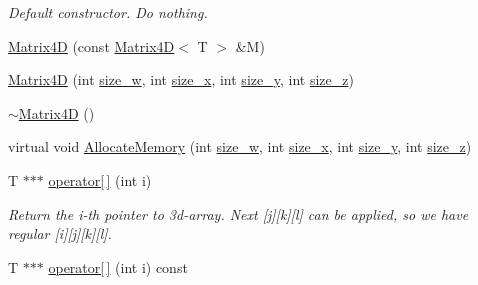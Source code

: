 \begin{DoxyCompactItemize}
\begin{DoxyCompactList}\small\item\em Default constructor. Do nothing. \end{DoxyCompactList}\item 
\hyperlink{class_matrix4_d_abc926df70f376a6002f8a87c5af64c21}{Matrix4\+D} (const \hyperlink{class_matrix4_d}{Matrix4\+D}$<$ T $>$ \&M)
\item 
\hyperlink{class_matrix4_d_a2ea183891bdf8361b090460dd67726fd}{Matrix4\+D} (int \hyperlink{class_matrix4_d_a31cea34356ad05c4ceb7d30335dce12c}{size\+\_\+w}, int \hyperlink{class_matrix4_d_a54dd815737a0dc10f0aa5e6275d07511}{size\+\_\+x}, int \hyperlink{class_matrix4_d_a0aedb1cd50bb694fbf74eb7068069da8}{size\+\_\+y}, int \hyperlink{class_matrix4_d_a8db60ddcda3b507665e2a4fb0dcf638a}{size\+\_\+z})
\item 
\hyperlink{class_matrix4_d_a2062fdb472d0426e49c62169c93e3b26}{$\sim$\+Matrix4\+D} ()
\item 
virtual void \hyperlink{class_matrix4_d_a6c541778e431631eaeb78bfa8e44af70}{Allocate\+Memory} (int \hyperlink{class_matrix4_d_a31cea34356ad05c4ceb7d30335dce12c}{size\+\_\+w}, int \hyperlink{class_matrix4_d_a54dd815737a0dc10f0aa5e6275d07511}{size\+\_\+x}, int \hyperlink{class_matrix4_d_a0aedb1cd50bb694fbf74eb7068069da8}{size\+\_\+y}, int \hyperlink{class_matrix4_d_a8db60ddcda3b507665e2a4fb0dcf638a}{size\+\_\+z})
\item 
T $\ast$$\ast$$\ast$ \hyperlink{class_matrix4_d_aa1937700dc627bd2ff8381c48345385e}{operator\mbox{[}$\,$\mbox{]}} (int i)
\begin{DoxyCompactList}\small\item\em Return the i-\/th pointer to 3d-\/array. Next \mbox{[}j\mbox{]}\mbox{[}k\mbox{]}\mbox{[}l\mbox{]} can be applied, so we have regular \mbox{[}i\mbox{]}\mbox{[}j\mbox{]}\mbox{[}k\mbox{]}\mbox{[}l\mbox{]}. \end{DoxyCompactList}\item 
\hypertarget{class_matrix4_d_afa1dde08f2593ae6d54b7668fbf9a09a}{}T $\ast$$\ast$$\ast$ \hyperlink{class_matrix4_d_afa1dde08f2593ae6d54b7668fbf9a09a}{operator\mbox{[}$\,$\mbox{]}} (int i) const \label{class_matrix4_d_afa1dde08f2593ae6d54b7668fbf9a09a}


\end{DoxyCompactItemize}
